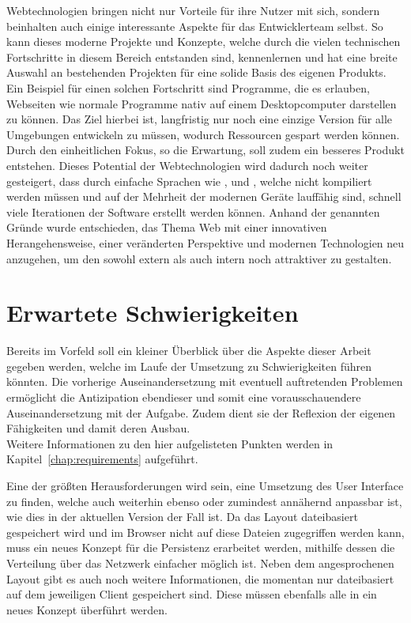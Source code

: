 Webtechnologien bringen nicht nur Vorteile für ihre Nutzer mit sich, sondern beinhalten auch einige interessante Aspekte für das Entwicklerteam selbst. So kann dieses moderne Projekte und Konzepte, welche durch die vielen technischen Fortschritte in diesem Bereich entstanden sind, kennenlernen und hat eine breite Auswahl an bestehenden Projekten für eine solide Basis des eigenen Produkts. Ein Beispiel für einen solchen Fortschritt sind Programme, die es erlauben, Webseiten wie normale Programme nativ auf einem Desktopcomputer darstellen zu können. Das Ziel hierbei ist, langfristig nur noch eine einzige Version für alle Umgebungen entwickeln zu müssen, wodurch Ressourcen gespart werden können. Durch den einheitlichen Fokus, so die Erwartung, soll zudem ein besseres Produkt entstehen. Dieses Potential der Webtechnologien wird dadurch noch weiter gesteigert, dass durch einfache Sprachen wie ,  und , welche nicht kompiliert werden müssen und auf der Mehrheit der modernen Geräte lauffähig sind, schnell viele Iterationen der Software erstellt werden können.
Anhand der genannten Gründe wurde entschieden, das Thema Web mit einer innovativen Herangehensweise, einer veränderten Perspektive und modernen Technologien neu anzugehen, um den  sowohl extern als auch intern noch attraktiver zu gestalten.

\section{Erwartete Schwierigkeiten}
Bereits im Vorfeld soll ein kleiner Überblick über die Aspekte dieser Arbeit gegeben werden, welche im Laufe der Umsetzung zu Schwierigkeiten führen könnten. Die vorherige Auseinandersetzung mit eventuell auftretenden Problemen ermöglicht die Antizipation ebendieser und somit eine vorausschauendere Auseinandersetzung mit der Aufgabe. Zudem dient sie der Reflexion der eigenen Fähigkeiten und damit deren Ausbau.\\ Weitere Informationen zu den hier aufgelisteten Punkten werden in Kapitel~\ref{chap:requirements} aufgeführt.

Eine der größten Herausforderungen wird sein, eine Umsetzung des User Interface zu finden, welche auch weiterhin ebenso oder zumindest annähernd anpassbar ist, wie dies in der aktuellen Version der Fall ist. Da das Layout dateibasiert gespeichert wird und im Browser nicht auf diese Dateien zugegriffen werden kann, muss ein neues Konzept für die Persistenz erarbeitet werden, mithilfe dessen die Verteilung über das Netzwerk einfacher möglich ist. 
Neben dem angesprochenen Layout gibt es auch noch weitere Informationen, die momentan nur dateibasiert auf dem jeweiligen Client gespeichert sind. Diese müssen ebenfalls alle in ein neues Konzept überführt werden.

